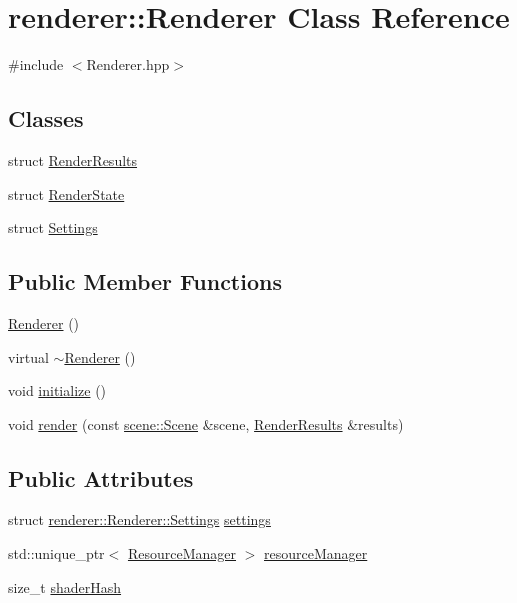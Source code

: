 \hypertarget{classrenderer_1_1Renderer}{\section{renderer\-:\-:Renderer Class Reference}
\label{classrenderer_1_1Renderer}
}


{\ttfamily \#include $<$Renderer.\-hpp$>$}

\subsection*{Classes}
\begin{DoxyCompactItemize}
\item 
struct \hyperlink{structrenderer_1_1Renderer_1_1RenderResults}{Render\-Results}
\item 
struct \hyperlink{structrenderer_1_1Renderer_1_1RenderState}{Render\-State}
\item 
struct \hyperlink{structrenderer_1_1Renderer_1_1Settings}{Settings}
\end{DoxyCompactItemize}
\subsection*{Public Member Functions}
\begin{DoxyCompactItemize}
\item 
\hyperlink{classrenderer_1_1Renderer_a07e4a2a3199e730df7eb1065159450cf}{Renderer} ()
\item 
virtual \hyperlink{classrenderer_1_1Renderer_a7a0e3c64074ff83ddf92b326508f29dd}{$\sim$\-Renderer} ()
\item 
void \hyperlink{classrenderer_1_1Renderer_aa0451a324f44861a8e11fc4d4c13006a}{initialize} ()
\item 
void \hyperlink{classrenderer_1_1Renderer_a1ed08a8d1b263f01798cae8c8e917701}{render} (const \hyperlink{classscene_1_1Scene}{scene\-::\-Scene} \&scene, \hyperlink{structrenderer_1_1Renderer_1_1RenderResults}{Render\-Results} \&results)
\end{DoxyCompactItemize}
\subsection*{Public Attributes}
\begin{DoxyCompactItemize}
\item 
struct \hyperlink{structrenderer_1_1Renderer_1_1Settings}{renderer\-::\-Renderer\-::\-Settings} \hyperlink{classrenderer_1_1Renderer_aaec552b957bd97685f9a3d860966cbf4}{settings}
\item 
std\-::unique\-\_\-ptr$<$ \hyperlink{classrenderer_1_1ResourceManager}{Resource\-Manager} $>$ \hyperlink{classrenderer_1_1Renderer_a34f886fb0da17d81d76b35f7719e836b}{resource\-Manager}
\item 
size\-\_\-t \hyperlink{classrenderer_1_1Renderer_a8e020b5c6fb6e8b217a2732bc601e167}{shader\-Hash}
\end{DoxyCompactItemize}


